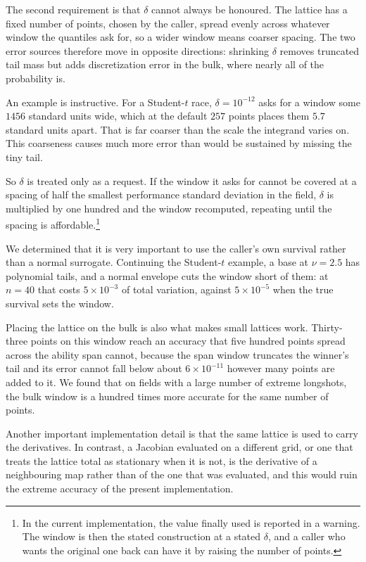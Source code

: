 \documentclass[11pt]{article}
\begin{document}
The second requirement is that $\delta$ cannot always be honoured. The
lattice has a fixed number of points, chosen by the caller, spread evenly
across whatever window the quantiles ask for, so a wider window means
coarser spacing. The two error sources therefore move in opposite
directions: shrinking $\delta$ removes truncated tail mass but adds
discretization error in the bulk, where nearly all of the probability is.

An example is instructive. For a Student-$t$ race, $\delta=10^{-12}$ asks for a window some
$1456$ standard units wide, which at the default $257$ points places them
$5.7$ standard units apart. That is far coarser than the scale the
integrand varies on. This coarseness causes much more error than would be sustained by missing the tiny tail.

So $\delta$ is treated only as a request. If the window it asks for cannot be
covered at a spacing of half the smallest performance standard deviation
in the field, $\delta$ is multiplied by one hundred and the window
recomputed, repeating until the spacing is affordable.\footnote{In the
current implementation, the value finally used is reported in a warning.
The window is then the stated construction at a stated $\delta$, and a
caller who wants the original one back can have it by raising the number
of points.}

We determined that it is very important to use the caller's own
survival rather than a normal surrogate. Continuing the Student-$t$
example, a base at $\nu=2.5$ has polynomial tails, and a normal envelope
cuts the window short of them: at $n=40$ that costs
$5\times10^{-3}$ of total variation, against $5\times10^{-5}$ when the
true survival sets the window.

Placing the lattice on the bulk is also what makes small lattices work.
Thirty-three points on this window reach an accuracy that five hundred
points spread across the ability span cannot, because the span window
truncates the winner's tail and its error cannot fall below about
$6\times10^{-11}$ however many points are added to it. We found that on
fields with a large number of extreme longshots, the bulk window is a
hundred times more accurate for the same number of points.

Another important implementation detail is that the same lattice is used to carry the derivatives. In contrast, a Jacobian evaluated on a
different grid, or one that treats the lattice total as stationary when
it is not, is the derivative of a neighbouring map rather than of the
one that was evaluated, and this would ruin the extreme accuracy of the present implementation.
\end{document}
